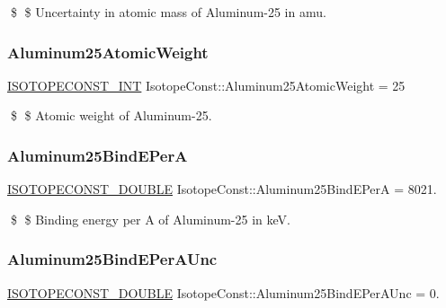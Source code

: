 \$ \$ Uncertainty in atomic mass of Aluminum-\/25 in amu. \mbox{\label{group___isotope_const-_aluminum-_al25_ga8583b9885429ed832b16cb10f8424758}} 
\subsubsection{\texorpdfstring{Aluminum25\+Atomic\+Weight}{Aluminum25AtomicWeight}}
{\footnotesize\ttfamily \mbox{\hyperlink{group___isotope_const-_macros_ga5f18360b3e99483a35c32d789e62621c}{I\+S\+O\+T\+O\+P\+E\+C\+O\+N\+S\+T\+\_\+\+I\+NT}} Isotope\+Const\+::\+Aluminum25\+Atomic\+Weight = 25}

\$ \$ Atomic weight of Aluminum-\/25. \mbox{\label{group___isotope_const-_aluminum-_al25_ga2e1e56850a150af33fe2d6a21eaaa5f5}} 
\subsubsection{\texorpdfstring{Aluminum25\+Bind\+E\+PerA}{Aluminum25BindEPerA}}
{\footnotesize\ttfamily \mbox{\hyperlink{group___isotope_const-_macros_ga8f45a7272ce02c0b4c65c44636ed719a}{I\+S\+O\+T\+O\+P\+E\+C\+O\+N\+S\+T\+\_\+\+D\+O\+U\+B\+LE}} Isotope\+Const\+::\+Aluminum25\+Bind\+E\+PerA = 8021.}

\$ \$ Binding energy per A of Aluminum-\/25 in keV. \mbox{\label{group___isotope_const-_aluminum-_al25_ga8e051ba8ceed6ddc571f1d2279c70330}} 
\subsubsection{\texorpdfstring{Aluminum25\+Bind\+E\+Per\+A\+Unc}{Aluminum25BindEPerAUnc}}
{\footnotesize\ttfamily \mbox{\hyperlink{group___isotope_const-_macros_ga8f45a7272ce02c0b4c65c44636ed719a}{I\+S\+O\+T\+O\+P\+E\+C\+O\+N\+S\+T\+\_\+\+D\+O\+U\+B\+LE}} Isotope\+Const\+::\+Aluminum25\+Bind\+E\+Per\+A\+Unc = 0.}

